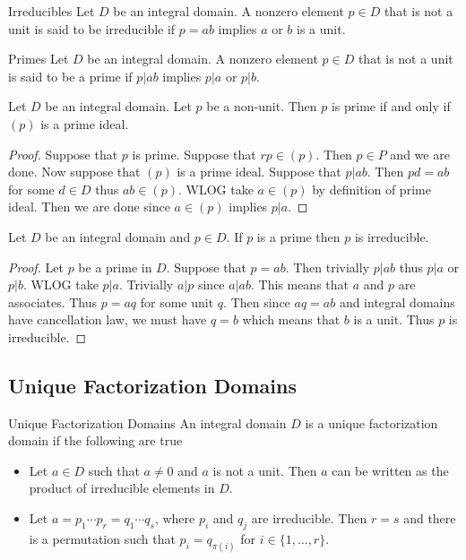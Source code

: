 \documentclass[a4paper]{article}
\begin{document}
\begin{defn}{Irreducibles}{} Let $D$ be an integral domain. A nonzero element $p\in D$ that is not a unit is said to be irreducible if $p=ab$ implies $a$ or $b$ is a unit. 
\end{defn}

\begin{defn}{Primes}{} Let $D$ be an integral domain. A nonzero element $p\in D$ that is not a unit is said to be a prime if $p|ab$ implies $p|a$ or $p|b$. 
\end{defn}

\begin{lmm}{}{} Let $D$ be an integral domain. Let $p$ be a non-unit. Then $p$ is prime if and only if $(p)$ is a prime ideal. \tcbline
\begin{proof}
Suppose that $p$ is prime. Suppose that $rp\in(p)$. Then $p\in P$ and we are done. Now suppose that $(p)$ is a prime ideal. Suppose that $p|ab$. Then $pd=ab$ for some $d\in D$ thus $ab\in(p)$. WLOG take $a\in(p)$ by definition of prime ideal. Then we are done since $a\in(p)$ implies $p|a$. 
\end{proof}
\end{lmm}

\begin{prp}{}{} Let $D$ be an integral domain and $p\in D$. If $p$ is a prime then $p$ is irreducible. \tcbline
\begin{proof}
Let $p$ be a prime in $D$. Suppose that $p=ab$. Then trivially $p|ab$ thus $p|a$ or $p|b$. WLOG take $p|a$. Trivially $a|p$ since $a|ab$. This means that $a$ and $p$ are associates. Thus $p=aq$ for some unit $q$. Then since $aq=ab$ and integral domains have cancellation law, we must have $q=b$ which means that $b$ is a unit. Thus $p$ is irreducible. 
\end{proof}
\end{prp}

\subsection{Unique Factorization Domains}
\begin{defn}{Unique Factorization Domains}{} An integral domain $D$ is a unique factorization domain if the following are true
\begin{itemize}
\item Let $a\in D$ such that $a\neq 0$ and $a$ is not a unit. Then $a$ can be written as the product of irreducible elements in $D$. 
\item Let $a=p_1\cdots p_r=q_1\cdots q_s$, where $p_i$ and $q_j$ are irreducible. Then $r=s$ and there is a permutation such that $p_i=q_{\pi(i)}$ for $i\in\{1,\dots,r\}$. 
\end{itemize}
\end{defn}
\end{document}
